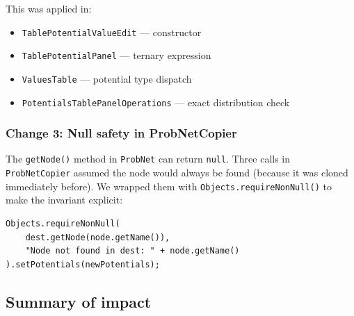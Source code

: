 \documentclass[12pt,a4paper]{article}
\newcommand{\code}[1]{\texttt{#1}}
\newcommand{\cls}[1]{\texttt{#1}}
\newcommand{\meth}[1]{\texttt{#1}}
\begin{document}
This was applied in:
\begin{itemize}[nosep]
  \item \cls{TablePotentialValueEdit} --- constructor
  \item \cls{TablePotentialPanel} --- ternary expression
  \item \cls{ValuesTable} --- potential type dispatch
  \item \cls{PotentialsTablePanelOperations} --- exact distribution
        check
\end{itemize}

\subsubsection{Change 3: Null safety in ProbNetCopier}

The \meth{getNode()} method in \cls{ProbNet} can return \code{null}.
Three calls in \cls{ProbNetCopier} assumed the node would always be
found (because it was cloned immediately before). We wrapped them with
\meth{Objects.requireNonNull()} to make the invariant explicit:

\begin{lstlisting}[caption={ProbNetCopier.java --- null safety}]
Objects.requireNonNull(
    dest.getNode(node.getName()),
    "Node not found in dest: " + node.getName()
).setPotentials(newPotentials);
\end{lstlisting}

\subsection{Summary of impact}
\end{document}
